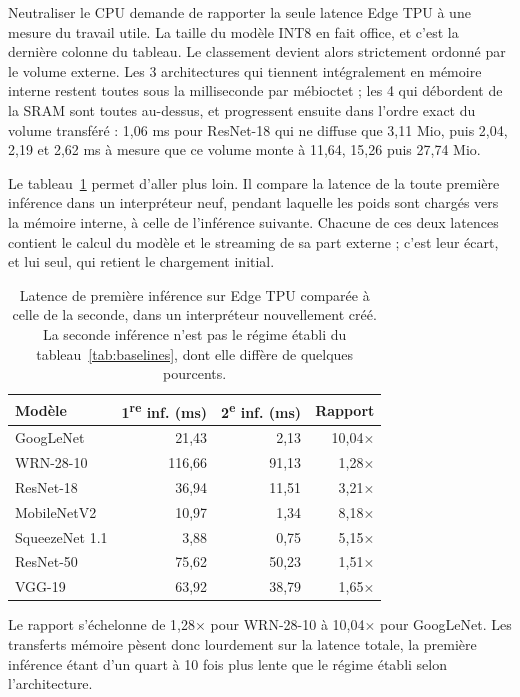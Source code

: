 \documentclass[11pt,a4paper]{report}
\begin{document}
Neutraliser le CPU demande de rapporter la seule latence Edge TPU à une mesure du travail utile. La taille du modèle INT8 en fait office, et c'est la dernière colonne du tableau. Le classement devient alors strictement ordonné par le volume externe. Les 3 architectures qui tiennent intégralement en mémoire interne restent toutes sous la milliseconde par mébioctet ; les 4 qui débordent de la SRAM sont toutes au-dessus, et progressent ensuite dans l'ordre exact du volume transféré : 1,06 ms pour ResNet-18 qui ne diffuse que 3,11 Mio, puis 2,04, 2,19 et 2,62 ms à mesure que ce volume monte à 11,64, 15,26 puis 27,74 Mio.

Le tableau~\ref{tab:coldstart} permet d'aller plus loin. Il compare la latence de la toute première inférence dans un interpréteur neuf, pendant laquelle les poids sont chargés vers la mémoire interne, à celle de l'inférence suivante. Chacune de ces deux latences contient le calcul du modèle et le streaming de sa part externe ; c'est leur écart, et lui seul, qui retient le chargement initial.

\begin{table}[H]
\centering\small
\caption[Latence de démarrage à froid sur Edge TPU]{Latence de première inférence sur Edge TPU comparée à celle de la seconde, dans un interpréteur nouvellement créé. La seconde inférence n'est pas le régime établi du tableau~\ref{tab:baselines}, dont elle diffère de quelques pourcents.}
\label{tab:coldstart}
\begin{tabular}{lrrr}
\toprule
Modèle & 1\textsuperscript{re} inf. (ms) & 2\textsuperscript{e} inf. (ms) & Rapport \\
\midrule
GoogLeNet       &  21,43 &  2,13 & 10,04$\times$ \\
WRN-28-10       & 116,66 & 91,13 &  1,28$\times$ \\
ResNet-18       &  36,94 & 11,51 &  3,21$\times$ \\
MobileNetV2     &  10,97 &  1,34 &  8,18$\times$ \\
SqueezeNet 1.1  &   3,88 &  0,75 &  5,15$\times$ \\
ResNet-50       &  75,62 & 50,23 &  1,51$\times$ \\
VGG-19          &  63,92 & 38,79 &  1,65$\times$ \\
\bottomrule
\end{tabular}
\end{table}

Le rapport s'échelonne de 1,28$\times$ pour WRN-28-10 à 10,04$\times$ pour GoogLeNet. Les transferts mémoire pèsent donc lourdement sur la latence totale, la première inférence étant d'un quart à 10 fois plus lente que le régime établi selon l'architecture.
\end{document}
